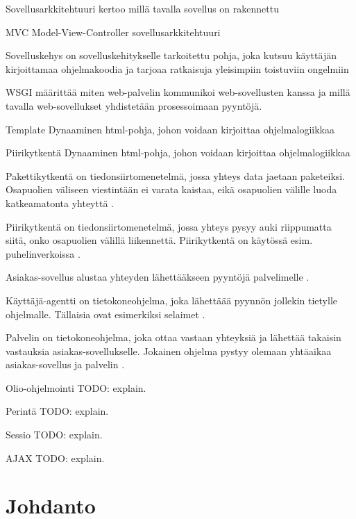 \documentclass[utf8]{gradu3}
\begin{document}
\begin{thetermlist}
\item[Sovellusarkkitehtuuri] kertoo millä tavalla sovellus on rakennettu
\item[MVC] Model-View-Controller sovellusarkkitehtuuri
\item[Sovelluskehys] on sovelluskehitykselle tarkoitettu pohja, joka kutsuu käyttäjän kirjoittamaa ohjelmakoodia ja tarjoaa ratkaisuja yleisimpiin toistuviin ongelmiin
\item[WSGI] määrittää miten web-palvelin kommunikoi web-sovellusten kanssa ja millä tavalla web-sovellukset
yhdistetään prosessoimaan pyyntöjä.
\item[Template] Dynaaminen html-pohja, johon voidaan kirjoittaa ohjelmalogiikkaa
\item[Piirikytkentä] Dynaaminen html-pohja, johon voidaan kirjoittaa ohjelmalogiikkaa
\item[Pakettikytkentä] on tiedonsiirtomenetelmä, jossa yhteys data jaetaan paketeiksi. Osapuolien väliseen viestintään ei varata kaistaa, eikä osapuolien välille luoda katkeamatonta yhteyttä \parencite{kytkenta}.
\item[Piirikytkentä] on tiedonsiirtomenetelmä, jossa yhteys pysyy auki riippumatta siitä, onko osapuolien välillä liikennettä. Piirikytkentä on käytössä esim. puhelinverkoissa \parencite{kytkenta}.
\item[Asiakas-sovellus] alustaa yhteyden lähettääkseen pyyntöjä palvelimelle \cite{http}.
\item[Käyttäjä-agentti] on tietokoneohjelma, joka lähettäää pyynnön jollekin tietylle ohjelmalle. Tällaisia ovat esimerkiksi selaimet \cite{http}. 
\item[Palvelin] on tietokoneohjelma, joka ottaa vastaan yhteyksiä ja lähettää takaisin vastauksia asiakas-sovellukselle. Jokainen ohjelma pystyy olemaan yhtäaikaa asiakas-sovellus ja palvelin \cite{http}. 
\item[Olio-ohjelmointi] TODO: explain. 
\item[Perintä] TODO: explain. 
\item[Sessio] TODO: explain. 
\item[AJAX] TODO: explain. 
\end{thetermlist}

\mainmatter

\chapter{Johdanto}
\end{document}
